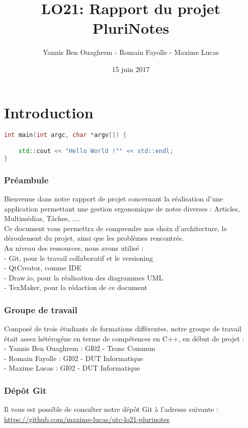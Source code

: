 \documentclass[a4paper]{report}
\begin{document}
\author{Yannis Ben Ouaghrem - Romain Fayolle - Maxime Lucas}
\date{15 juin 2017}
\title{LO21: Rapport du projet PluriNotes}
\maketitle

\tableofcontents

\newpage
\section{Introduction}
\begin{lstlisting}[language={c++}]
int main(int argc, char *argv[]) {

    std::cout << "Hello World !"" << std::endl;
}
\end{lstlisting}
\subsubsection{Préambule}
Bienvenue dans notre rapport de projet concernant la réalisation d'une application permettant une gestion ergonomique de notes diverses : Articles, Multimédias, Tâches, ....\\
Ce document vous permettra de comprendre nos choix d'architecture, le déroulement du projet, ainsi que les problèmes rencontrés.\\
Au niveau des ressources, nous avons utilisé : \\
- Git, pour le travail collaboratif et le versioning \\
- QtCreator, comme IDE \\
- Draw.io, pour la réalisation des diagrammes UML\\
- TexMaker, pour la rédaction de ce document

\subsubsection{Groupe de travail}
Composé de trois étudiants de formations différentes, notre groupe de travail était assez hétérogéne en terme de compétences en C++, en début de projet :\\
- Yannis Ben Ouaghrem : GI02 - Tronc Commun \\
- Romain Fayolle : GI02 - DUT Informatique \\
- Maxime Lucas : GI02 - DUT Informatique

\subsubsection{Dépôt Git}
Il vous est possible de consulter notre dépôt Git à l'adresse suivante : \\
\url{https://github.com/maxime-lucas/utc-lo21-plurinotes}
\end{document}
